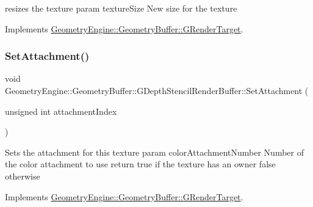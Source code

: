resizes the texture param texture\+Size New size for the texture 

Implements \mbox{\hyperlink{class_geometry_engine_1_1_geometry_buffer_1_1_g_render_target_ac1e54f456408b53de44fe10116d649dd}{Geometry\+Engine\+::\+Geometry\+Buffer\+::\+G\+Render\+Target}}.

\mbox{\label{class_geometry_engine_1_1_geometry_buffer_1_1_g_depth_stencil_render_buffer_af2877932c33e892f310de1c07ad69a20}} 
\subsubsection{\texorpdfstring{SetAttachment()}{SetAttachment()}\hspace{0.1cm}{\footnotesize\ttfamily [1/2]}}
{\footnotesize\ttfamily void Geometry\+Engine\+::\+Geometry\+Buffer\+::\+G\+Depth\+Stencil\+Render\+Buffer\+::\+Set\+Attachment (\begin{DoxyParamCaption}\item[{unsigned int}]{attachment\+Index }\end{DoxyParamCaption})\hspace{0.3cm}{\ttfamily [virtual]}}

Sets the attachment for this texture param color\+Attachment\+Number Number of the color attachment to use return true if the texture has an owner false otherwise 

Implements \mbox{\hyperlink{class_geometry_engine_1_1_geometry_buffer_1_1_g_render_target_a1031c44ad374654e2183d3b1b99638a3}{Geometry\+Engine\+::\+Geometry\+Buffer\+::\+G\+Render\+Target}}.

\mbox{\label{class_geometry_engine_1_1_geometry_buffer_1_1_g_depth_stencil_render_buffer_aa207dc312758fcd7657836e6783c14e4}} 

